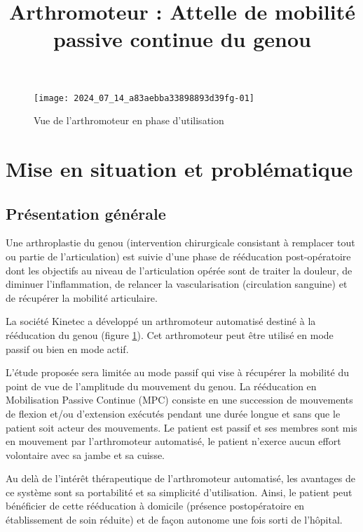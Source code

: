 

\title{Arthromoteur : Attelle de mobilité passive continue du genou }
\maketitle
\begin{figure}[!h]
\centering
\texttt{[image: 2024\_07\_14\_a83aebba33898893d39fg-01]}

\caption{\label{fig:ccs_mp_2024:fig:01} Vue de l'arthromoteur en phase d'utilisation}
\end{figure}

\section{Mise en situation et problématique}
\subsection{Présentation générale}
Une arthroplastie du genou (intervention chirurgicale consistant à remplacer tout ou partie de l'articulation) est suivie d'une phase de rééducation post-opératoire dont les objectifs au niveau de l'articulation opérée sont de traiter la douleur, de diminuer l'inflammation, de relancer la vascularisation (circulation sanguine) et de récupérer la mobilité articulaire.

La société Kinetec a développé un arthromoteur automatisé destiné à la rééducation du genou (figure \ref{fig:ccs_mp_2024:fig:01}). Cet arthromoteur peut être utilisé en mode passif ou bien en mode actif.

L'étude proposée sera limitée au mode passif qui vise à récupérer la mobilité du point de vue de l'amplitude du mouvement du genou. La rééducation en Mobilisation Passive Continue (MPC) consiste en une succession de mouvements de flexion et/ou d'extension exécutés pendant une durée longue et sans que le patient soit acteur des mouvements. Le patient est passif et ses membres sont mis en mouvement par l'arthromoteur automatisé, le patient n'exerce aucun effort volontaire avec sa jambe et sa cuisse.

Au delà de l'intérêt thérapeutique de l'arthromoteur automatisé, les avantages de ce système sont sa portabilité et sa simplicité d'utilisation. Ainsi, le patient peut bénéficier de cette rééducation à domicile (présence postopératoire en établissement de soin réduite) et de façon autonome une fois sorti de l'hôpital.

